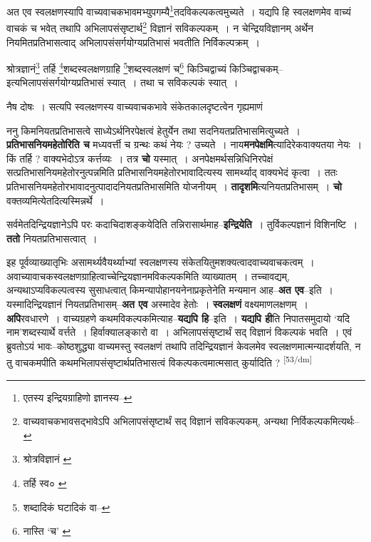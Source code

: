 \documentclass[article,12pt,a4paper]{memoir}
\begin{document}
	  \pstart अत एव स्वलक्षणस्यापि वाच्यवाचकभावमभ्युपगम्यै\footnote{एतस्य इन्द्रियग्राहिणो ज्ञानस्य--\cite{dp-msD-n}}तदविकल्पकत्वमुच्यते । यद्यपि हि स्वलक्षणमेव वाच्यं वाचकं च भवेत् तथापि अभिलापसंसृष्टार्थ\footnote{वाच्यवाचकभावसद्भावेऽपि अभिलापसंसृष्टार्थं सद् विज्ञानं सविकल्पकम्, अन्यथा निर्विकल्पकमित्यर्थः--\cite{dp-msD-n}} विज्ञानं सविकल्पकम् । न चेन्द्रियविज्ञानम् अर्थेन नियमितप्रतिभासत्वाद् अभिलापसंसर्गयोग्यप्रतिभासं भवतीति निर्विकल्पक्रम् ।
	\pend
       

	  \pstart श्रोत्रज्ञानं\footnote{श्रोत्रविज्ञानं \cite{dp-msB} \cite{dp-msD} \cite{dp-edN}} तर्हि \footnote{तर्हि स्व० \cite{dp-msB}}शब्दस्वलक्षणग्राहि \footnote{शब्दादिकं घटादिकं वा--\cite{dp-msD-n}}शब्दस्वलक्षणं च\footnote{नास्ति ‘च’ \cite{dp-msA} \cite{dp-edP} \cite{dp-edH} \cite{dp-edE}} किञ्चिद्वाच्यं किञ्चिद्वाचकम्--इत्यभिलापसंसर्गयोग्यप्रतिभासं स्यात् । तथा च सविकल्पकं स्यात् ।
	\pend
       

	  \pstart नैष दोषः । सत्यपि स्वलक्षणस्य वाच्यवाचकभावे संकेतकालदृष्टत्वेन गृह्यमाणं
	\pend
      

	  \pstart ननु किमनियतप्रतिभासत्वे साध्येऽर्थनिरपेक्षत्वं हेतुर्येन तथा सदनियतप्रतिभासमित्युच्यते । \textbf{प्रतिभासनियमहेतोरिति च} मध्यवर्त्ती च ग्रन्थः कथं नेयः ? उच्यते । नाय\textbf{मनपेक्षमि}त्यादिरेकवाक्यतया नेयः । किं तर्हि ? वाक्यभेदोऽत्र कर्त्तव्यः । तत्र \textbf{चो} यस्मात् । अनपेक्षमर्थसन्निधिनिरपेक्षं सत्प्रतिभासनियमहेतोरनुत्पन्नमिति प्रतिभासनियमहेतोरभावादित्यस्य सामर्थ्याद् वाक्यभेदं कृत्वा । ततः प्रतिभासनियमहेतोरभावादनुत्पादादनियतप्रतिभासमिति योजनीयम् । \textbf{तादृशमि}त्यनियतप्रतिभासम् । \textbf{चो} वक्तव्यमित्येतदित्यस्मिन्नर्थे ।
	\pend
      

	  \pstart सर्वमेतदिन्द्रियज्ञानेऽपि परः कदाचिदाशङ्कयेदिति तन्निरासार्थमाह--\textbf{इन्द्रियेति} । तुर्विकल्पज्ञानं विशिनष्टि । \textbf{ततो} नियतप्रतिभासत्वात् ।
	\pend
      

	  \pstart इह पूर्वव्याख्यातृभिः असामर्थ्यवैयर्थ्याभ्यां स्वलक्षणस्य संकेतयितुमशक्यत्वादवाच्यवाचकत्वम् । अवाच्यावाचकस्वलक्षणग्राहित्वाच्चेन्द्रियज्ञानमविकल्पकमिति व्याख्यातम् । तच्चावद्यम्, अन्यथाऽप्यविकल्पत्वस्य सुसाधत्वात् किमन्यापोहानयनेनाप्रकृतेनेति मन्यमान आह--\textbf{अत एव}--इति । यस्मादिन्द्रियज्ञानं नियतप्रतिभासम्--\textbf{अत एव} अस्मादेव हेतोः । \textbf{स्वलक्षणं} वक्ष्यमाणलक्षणम् । \textbf{अपि}रवधारणे । वाच्यग्रहणे कथमविकल्पकमित्याह--\textbf{यद्यपि हि}--इति । \textbf{यद्यपि ही}ति निपातसमुदायो ‘यदि नाम’शब्दस्यार्थे वर्त्तते । हिर्वाक्यालङ्कारो वा । अभिलापसंसृष्टार्थं सद् विज्ञानं विकल्पकं भवति । एवं ब्रुवतोऽयं भावः--कोष्ठशुद्ध्या वाच्यमस्तु स्वलक्षणं तथापि तदिन्द्रियज्ञानं केवलमेव स्वलक्षणमात्मन्यादर्शयति, न तु वाचकमपीति कथमभिलापसंसृष्टार्थप्रतिभासत्वं विकल्पकत्वमात्मसात् कुर्यादिति ?
	\pend
      \leavevmode\textsuperscript{\rmlatinfont\tiny [53/dm]}
\end{document}
